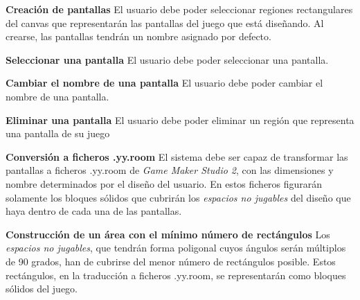 	\item \textbf{Creación de pantallas}\newline
		El usuario debe poder seleccionar regiones rectangulares del canvas que representarán las pantallas del juego que está diseñando. Al crearse, las pantallas tendrán un nombre asignado por defecto.
	\item \textbf{Seleccionar una pantalla}\newline
		El usuario debe poder seleccionar una pantalla.
	\item \textbf{Cambiar el nombre de una pantalla}\newline
		El usuario debe poder cambiar el nombre de una pantalla.
	\item \textbf{Eliminar una pantalla}\newline
		El usuario debe poder eliminar un región que representa una pantalla de su juego
	\item \textbf{Conversión a ficheros .yy.room}\newline
		El sistema debe ser capaz de transformar las pantallas a ficheros .yy.room de \textit{Game Maker Studio 2}, con las dimensiones y nombre determinados por el diseño del usuario. En estos ficheros figurarán solamente los bloques sólidos que cubrirán los \textit{espacios no jugables} del diseño que haya dentro de cada una de las pantallas.
		\begin{functional}
			\item \textbf{Construcción de un área con el mínimo número de rectángulos}\newline
				Los \textit{espacios no jugables}, que tendrán forma poligonal cuyos ángulos serán múltiplos de 90 grados, han de cubrirse del menor número de rectángulos posible. Estos rectángulos, en la traducción a ficheros .yy.room, se representarán como bloques sólidos del juego.
		\end{functional}
